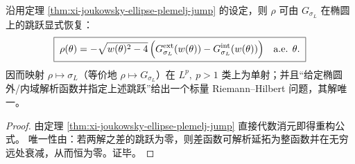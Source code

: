 

\begin{corollary}\label{cor:xi-joukowsky-ellipse-cauchy-inversion-rho}
沿用定理 \ref{thm:xi-joukowsky-ellipse-plemelj-jump} 的设定，则 \(\rho\) 可由 \(G_{\sigma_L}\) 在椭圆上的跳跃显式恢复：
\[
\boxed{\;
\rho(\theta)
=-\sqrt{w(\theta)^2-4}\,
\Bigl(G_{\sigma_L}^{\mathrm{ext}}(w(\theta))-G_{\sigma_L}^{\mathrm{int}}(w(\theta))\Bigr)
\quad\text{a.e. }\theta.\;}
\]
因而映射 \(\rho\mapsto \sigma_L\)（等价地 \(\rho\mapsto G_{\sigma_L}\)）在 \(L^p,\ p>1\) 类上为单射；并且“给定椭圆外/内域解析函数并指定上述跳跃”给出一个标量 Riemann--Hilbert 问题，其解唯一。
\end{corollary}
\begin{proof}
由定理 \ref{thm:xi-joukowsky-ellipse-plemelj-jump} 直接代数消元即得重构公式。
唯一性由：若两解之差的跳跃为零，则差函数可解析延拓为整函数并在无穷远处衰减，从而恒为零。证毕。
\end{proof}



